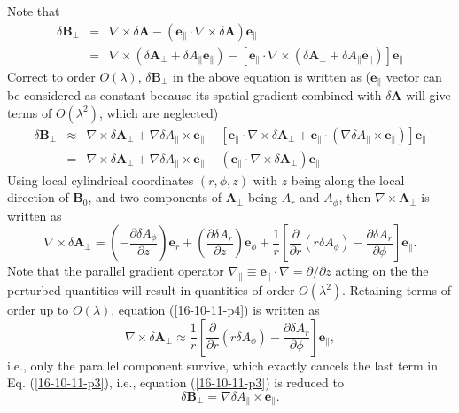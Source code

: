 \documentclass{article}
\begin{document}
Note that
\begin{eqnarray}
  \delta \mathbf{B}_{\perp} & = & \nabla \times \delta \mathbf{A}-
  (\mathbf{e}_{\parallel} \cdot \nabla \times \delta \mathbf{A})
  \mathbf{e}_{\parallel} \nonumber\\
  & = & \nabla \times (\delta \mathbf{A}_{\perp} + \delta A_{\parallel}
  \mathbf{e}_{\parallel}) - [\mathbf{e}_{\parallel} \cdot \nabla \times
  (\delta \mathbf{A}_{\perp} + \delta A_{\parallel} \mathbf{e}_{\parallel})]
  \mathbf{e}_{\parallel} 
\end{eqnarray}
Correct to order $O (\lambda)$, $\delta \mathbf{B}_{\perp}$ in the above
equation is written as ($\mathbf{e}_{\parallel}$ vector can be considered as
constant because its spatial gradient combined with $\delta \mathbf{A}$ will
give terms of $O (\lambda^2)$, which are neglected)
\begin{eqnarray}
  \delta \mathbf{B}_{\perp} & \approx & \nabla \times \delta
  \mathbf{A}_{\perp} + \nabla \delta A_{\parallel} \times
  \mathbf{e}_{\parallel} - [\mathbf{e}_{\parallel} \cdot \nabla \times \delta
  \mathbf{A}_{\perp} +\mathbf{e}_{\parallel} \cdot (\nabla \delta
  A_{\parallel} \times \mathbf{e}_{\parallel})] \mathbf{e}_{\parallel} \\
  & = & \nabla \times \delta \mathbf{A}_{\perp} + \nabla \delta A_{\parallel}
  \times \mathbf{e}_{\parallel} - (\mathbf{e}_{\parallel} \cdot \nabla \times
  \delta \mathbf{A}_{\perp}) \mathbf{e}_{\parallel}  \label{16-10-11-p3}
\end{eqnarray}
Using local cylindrical coordinates $(r, \phi, z)$ with $z$ being along the
local direction of $\mathbf{B}_0$, and two components of $\mathbf{A}_{\perp}$
being $A_r$ and $A_{\phi}$, then $\nabla \times \mathbf{A}_{\perp}$ is written
as
\begin{equation}
  \label{16-10-11-p4} \nabla \times \delta \mathbf{A}_{\perp} = \left( -
  \frac{\partial \delta A_{\phi}}{\partial z} \right) \mathbf{e}_r + \left( 
  \frac{\partial \delta A_r}{\partial z} \right) \mathbf{e}_{\phi} +
  \frac{1}{r} \left[  \frac{\partial}{\partial r} (r \delta A_{\phi}) -
  \frac{\partial \delta A_r}{\partial \phi} \right] \mathbf{e}_{\parallel} .
\end{equation}
Note that the parallel gradient operator $\nabla_{\parallel} \equiv
\mathbf{e}_{\parallel} \cdot \nabla = \partial / \partial z$ acting on the the
perturbed quantities will result in quantities of order $O (\lambda^2)$.
Retaining terms of order up to $O (\lambda)$, equation (\ref{16-10-11-p4}) is
written as
\begin{equation}
  \nabla \times \delta \mathbf{A}_{\perp} \approx \frac{1}{r} \left[ 
  \frac{\partial}{\partial r} (r \delta A_{\phi}) - \frac{\partial \delta
  A_r}{\partial \phi} \right] \mathbf{e}_{\parallel},
\end{equation}
i.e., only the parallel component survive, which exactly cancels the last term
in Eq. (\ref{16-10-11-p3}), i.e., equation (\ref{16-10-11-p3}) is reduced to
\begin{equation}
  \label{16-10-11-p7} \delta \mathbf{B}_{\perp} = \nabla \delta A_{\parallel}
  \times \mathbf{e}_{\parallel} .
\end{equation}
\end{document}
